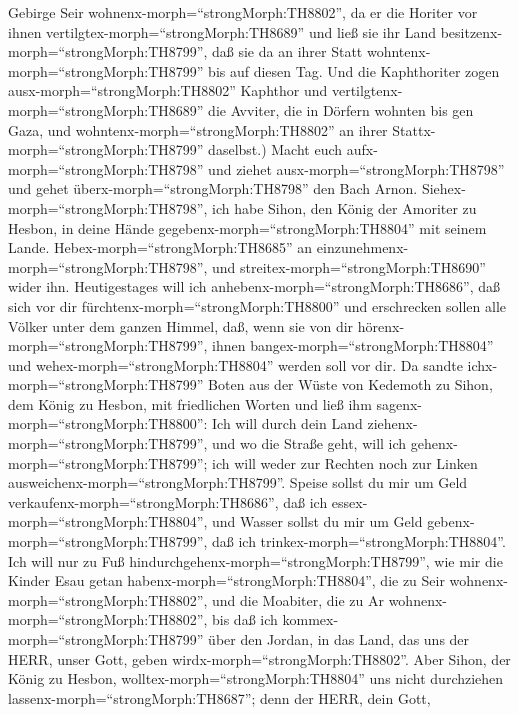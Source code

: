 Gebirge Seir wohnenx-morph=``strongMorph:TH8802'', da er die Horiter vor
ihnen vertilgtex-morph=``strongMorph:TH8689'' und ließ sie ihr Land
besitzenx-morph=``strongMorph:TH8799'', daß sie da an ihrer Statt
wohntenx-morph=``strongMorph:TH8799'' bis auf diesen Tag. 
Und die Kaphthoriter zogen ausx-morph=``strongMorph:TH8802'' Kaphthor
und vertilgtenx-morph=``strongMorph:TH8689'' die Avviter, die in Dörfern
wohnten bis gen Gaza, und wohntenx-morph=``strongMorph:TH8802'' an ihrer
Stattx-morph=``strongMorph:TH8799'' daselbst.)  Macht euch
aufx-morph=``strongMorph:TH8798'' und ziehet
ausx-morph=``strongMorph:TH8798'' und gehet
überx-morph=``strongMorph:TH8798'' den Bach Arnon.
Siehex-morph=``strongMorph:TH8798'', ich habe Sihon, den König der
Amoriter zu Hesbon, in deine Hände gegebenx-morph=``strongMorph:TH8804''
mit seinem Lande. Hebex-morph=``strongMorph:TH8685'' an
einzunehmenx-morph=``strongMorph:TH8798'', und
streitex-morph=``strongMorph:TH8690'' wider ihn. 
Heutigestages will ich anhebenx-morph=``strongMorph:TH8686'', daß sich
vor dir fürchtenx-morph=``strongMorph:TH8800'' und erschrecken sollen
alle Völker unter dem ganzen Himmel, daß, wenn sie von dir
hörenx-morph=``strongMorph:TH8799'', ihnen
bangex-morph=``strongMorph:TH8804'' und
wehex-morph=``strongMorph:TH8804'' werden soll vor dir.  Da
sandte ichx-morph=``strongMorph:TH8799'' Boten aus der Wüste von
Kedemoth zu Sihon, dem König zu Hesbon, mit friedlichen Worten und ließ
ihm sagenx-morph=``strongMorph:TH8800'':  Ich will durch
dein Land ziehenx-morph=``strongMorph:TH8799'', und wo die Straße geht,
will ich gehenx-morph=``strongMorph:TH8799''; ich will weder zur Rechten
noch zur Linken ausweichenx-morph=``strongMorph:TH8799''. 
Speise sollst du mir um Geld verkaufenx-morph=``strongMorph:TH8686'',
daß ich essex-morph=``strongMorph:TH8804'', und Wasser sollst du mir um
Geld gebenx-morph=``strongMorph:TH8799'', daß ich
trinkex-morph=``strongMorph:TH8804''. Ich will nur zu Fuß
hindurchgehenx-morph=``strongMorph:TH8799'',  wie mir die
Kinder Esau getan habenx-morph=``strongMorph:TH8804'', die zu Seir
wohnenx-morph=``strongMorph:TH8802'', und die Moabiter, die zu Ar
wohnenx-morph=``strongMorph:TH8802'', bis daß ich
kommex-morph=``strongMorph:TH8799'' über den Jordan, in das Land, das
uns der HERR, unser Gott, geben wirdx-morph=``strongMorph:TH8802''.
 Aber Sihon, der König zu Hesbon,
wolltex-morph=``strongMorph:TH8804'' uns nicht durchziehen
lassenx-morph=``strongMorph:TH8687''; denn der HERR, dein Gott,
